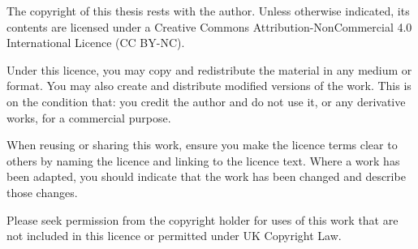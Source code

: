 \begin{license}
    The copyright of this thesis rests with the author. Unless otherwise indicated, its contents are licensed under a Creative Commons Attribution-NonCommercial 4.0 International Licence (CC BY-NC).

    Under this licence, you may copy and redistribute the material in any medium or format. You may also create and distribute modified versions of the work. This is on the condition that: you credit the author and do not use it, or any derivative works, for a commercial purpose.

    When reusing or sharing this work, ensure you make the licence terms clear to others by naming the licence and linking to the licence text. Where a work has been adapted, you should indicate that the work has been changed and describe those changes.

    Please seek permission from the copyright holder for uses of this work that are not included in this licence or permitted under UK Copyright Law.
\end{license}
